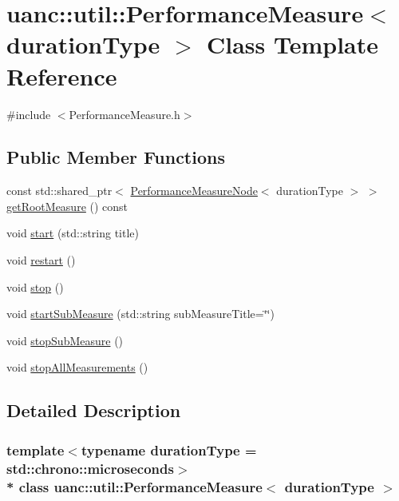 \hypertarget{classuanc_1_1util_1_1_performance_measure}{}\section{uanc\+:\+:util\+:\+:Performance\+Measure$<$ duration\+Type $>$ Class Template Reference}
\label{classuanc_1_1util_1_1_performance_measure}


{\ttfamily \#include $<$Performance\+Measure.\+h$>$}

\subsection*{Public Member Functions}
\begin{DoxyCompactItemize}
\item 
const std\+::shared\+\_\+ptr$<$ \hyperlink{classuanc_1_1util_1_1_performance_measure_node}{Performance\+Measure\+Node}$<$ duration\+Type $>$ $>$ \hyperlink{classuanc_1_1util_1_1_performance_measure_a851457bc741e9f21c1e8f949fc17c2bf}{get\+Root\+Measure} () const 
\item 
void \hyperlink{classuanc_1_1util_1_1_performance_measure_a63d1c53616c602fa930f2b17b50d7604}{start} (std\+::string title)
\item 
void \hyperlink{classuanc_1_1util_1_1_performance_measure_a5ce9bf037e972cb7adad94e0312e7504}{restart} ()
\item 
void \hyperlink{classuanc_1_1util_1_1_performance_measure_a6931b89f739c6f334b59e85a2b3ce5b8}{stop} ()
\item 
void \hyperlink{classuanc_1_1util_1_1_performance_measure_a7284b6620e998084b6cd548cb0b5c6c3}{start\+Sub\+Measure} (std\+::string sub\+Measure\+Title=\char`\"{}\char`\"{})
\item 
void \hyperlink{classuanc_1_1util_1_1_performance_measure_a82db8e78171d1dfbe4af7fda3fe67a54}{stop\+Sub\+Measure} ()
\item 
void \hyperlink{classuanc_1_1util_1_1_performance_measure_a0d5a7a487a2db18a748d17867e58b053}{stop\+All\+Measurements} ()
\end{DoxyCompactItemize}


\subsection{Detailed Description}
\subsubsection*{template$<$typename duration\+Type = std\+::chrono\+::microseconds$>$\\*
class uanc\+::util\+::\+Performance\+Measure$<$ duration\+Type $>$}

